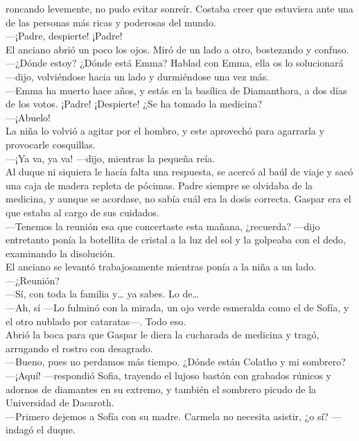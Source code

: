 \documentclass[
  letterpaper,
]{book}
\begin{document}
roncando levemente, no pudo evitar sonreír. Costaba creer que estuviera
ante una de las personas más ricas y poderosas del mundo.\\
---¡Padre, despierte! ¡Padre!\\
El anciano abrió un poco los ojos. Miró de un lado a otro, bostezando y
confuso.\\
---¿Dónde estoy? ¿Dónde está Emma? Hablad con Emma, ella os lo
solucionará ---dijo, volviéndose hacia un lado y durmiéndose una vez
más.\\
---Emma ha muerto hace años, y estás en la basílica de Diamanthora, a
dos días de los votos. ¡Padre! ¡Despierte! ¿Se ha tomado la medicina?\\
---¡Abuelo!\\
La niña lo volvió a agitar por el hombro, y este aprovechó para
agarrarla y provocarle cosquillas.\\
---¡Ya va, ya va! ---dijo, mientras la pequeña reía.\\
Al duque ni siquiera le hacía falta una respuesta, se acercó al baúl de
viaje y sacó una caja de madera repleta de pócimas. Padre siempre se
olvidaba de la medicina, y aunque se acordase, no sabía cuál era la
dosis correcta. Gaspar era el que estaba al cargo de sus cuidados.\\
---Tenemos la reunión esa que concertaste esta mañana, ¿recuerda?
---dijo entretanto ponía la botellita de cristal a la luz del sol y la
golpeaba con el dedo, examinando la disolución.\\
El anciano se levantó trabajosamente mientras ponía a la niña a un
lado.\\
---¿Reunión?\\
---Sí, con toda la familia y\ldots{} ya sabes. Lo de\ldots{}\\
---Ah, sí ---Lo fulminó con la mirada, un ojo verde esmeralda como el de
Sofía, y el otro nublado por cataratas---. Todo eso.\\
Abrió la boca para que Gaspar le diera la cucharada de medicina y tragó,
arrugando el rostro con desagrado.\\
---Bueno, pues no perdamos más tiempo. ¿Dónde están Colatho y mi
sombrero?\\
---¡Aquí! ---respondió Sofia, trayendo el lujoso bastón con grabados
rúnicos y adornos de diamantes en su extremo, y también el sombrero
picudo de la Universidad de Dacaroth.\\
---Primero dejemos a Sofía con su madre. Carmela no necesita asistir, ¿o
sí? --- indagó el duque.\\
\end{document}
